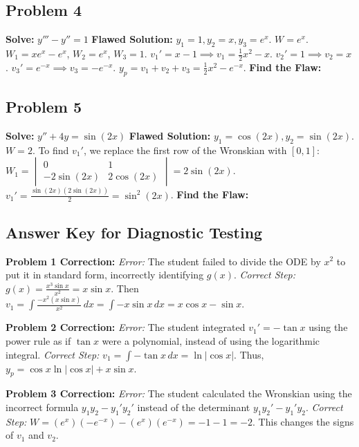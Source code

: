 \documentclass[12pt]{article}
\begin{document}
\subsection{Problem 4}
\textbf{Solve:} $y''' - y'' = 1$
\textbf{Flawed Solution:}
$y_1 = 1, y_2 = x, y_3 = e^x$. $W = e^x$.
$W_1 = x e^x - e^x$, $W_2 = e^x$, $W_3 = 1$.
$v_1' = x - 1 \implies v_1 = \frac{1}{2}x^2 - x$.
$v_2' = 1 \implies v_2 = x$.
$v_3' = e^{-x} \implies v_3 = -e^{-x}$.
$y_p = v_1 + v_2 + v_3 = \frac{1}{2}x^2 - e^{-x}$.
\textbf{Find the Flaw:}
\vspace{2cm}

\subsection{Problem 5}
\textbf{Solve:} $y'' + 4y = \sin(2x)$
\textbf{Flawed Solution:}
$y_1 = \cos(2x), y_2 = \sin(2x)$. $W = 2$.
To find $v_1'$, we replace the first row of the Wronskian with $[0, 1]$:
$W_1 = \begin{vmatrix} 0 & 1 \\ -2\sin(2x) & 2\cos(2x) \end{vmatrix} = 2\sin(2x)$.
$v_1' = \frac{\sin(2x)(2\sin(2x))}{2} = \sin^2(2x)$.
\textbf{Find the Flaw:}
\vspace{2cm}

\newpage
\subsection{Answer Key for Diagnostic Testing}

\textbf{Problem 1 Correction:}
\textit{Error:} The student failed to divide the ODE by $x^2$ to put it in standard form, incorrectly identifying $g(x)$.
\textit{Correct Step:} $g(x) = \frac{x^3 \sin x}{x^2} = x \sin x$. Then $v_1 = \int \frac{-x^2 (x \sin x)}{x^2} \, dx = \int -x \sin x \, dx = x \cos x - \sin x$.

\textbf{Problem 2 Correction:}
\textit{Error:} The student integrated $v_1' = -\tan x$ using the power rule as if $\tan x$ were a polynomial, instead of using the logarithmic integral.
\textit{Correct Step:} $v_1 = \int -\tan x \, dx = \ln|\cos x|$. Thus, $y_p = \cos x \ln|\cos x| + x \sin x$.

\textbf{Problem 3 Correction:}
\textit{Error:} The student calculated the Wronskian using the incorrect formula $y_1 y_2 - y_1' y_2'$ instead of the determinant $y_1 y_2' - y_1' y_2$.
\textit{Correct Step:} $W = (e^x)(-e^{-x}) - (e^x)(e^{-x}) = -1 - 1 = -2$. This changes the signs of $v_1$ and $v_2$.
\end{document}
